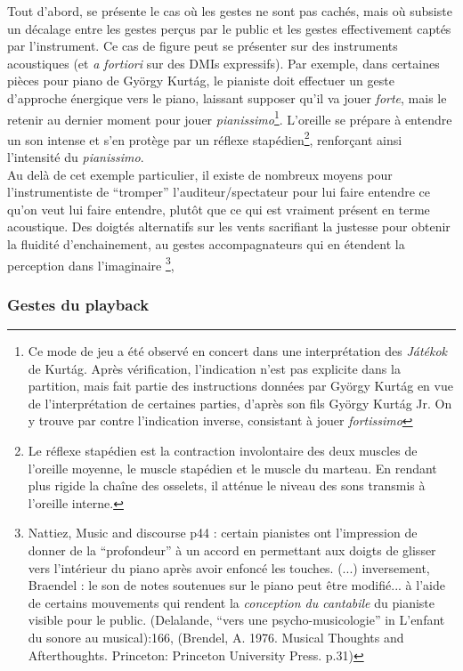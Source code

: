 \noindent Tout d'abord, se présente le cas où les gestes ne sont pas cachés, mais où subsiste un décalage entre les gestes perçus par le public et les gestes effectivement captés par l'instrument. Ce cas de figure peut se présenter sur des instruments acoustiques (et \textit{a fortiori} sur des \glspl{DMI} expressifs). Par exemple, dans certaines pièces pour piano de György Kurtág, le pianiste doit effectuer un geste d'approche énergique vers le piano, laissant supposer qu'il va jouer \textit{forte}, mais le retenir au dernier moment pour jouer \textit{pianissimo}\footnote{Ce mode de jeu a été observé en concert dans une interprétation des \textit{Játékok} de Kurtág. Après vérification, l'indication n'est pas explicite dans la partition, mais fait partie des instructions données par György Kurtág en vue de l'interprétation de certaines parties, d'après son fils György Kurtág Jr. On y trouve par contre l'indication inverse, consistant à jouer \textit{fortissimo} }. L'oreille se prépare à entendre un son intense et s'en protège par un réflexe stapédien\footnote{Le réflexe stapédien est la contraction involontaire des deux muscles de l'oreille moyenne, le muscle stapédien et le muscle du marteau. En rendant plus rigide la chaîne des osselets, il atténue le niveau des sons transmis à l'oreille interne.}, renforçant ainsi l'intensité du \textit{pianissimo}.\\
\indent Au delà de cet exemple particulier, il existe de nombreux moyens pour l'instrumentiste de ``tromper'' l'auditeur/spectateur pour lui faire entendre ce qu'on veut lui faire entendre, plutôt que ce qui est vraiment présent en terme acoustique. Des doigtés alternatifs sur les vents sacrifiant la justesse pour obtenir la fluidité d'enchainement, au gestes accompagnateurs qui en étendent la perception dans l'imaginaire \footnote{Nattiez, Music and discourse p44 : certain pianistes ont l'impression de donner de la ``profondeur'' à un accord en permettant aux doigts de glisser vers l'intérieur du piano après avoir enfoncé les touches. (...) inversement, Braendel : le son de notes soutenues sur le piano peut être modifié... à l'aide de certains mouvements qui rendent la \textit{conception du cantabile} du pianiste visible pour le public. (Delalande, ``vers une psycho-musicologie'' in L'enfant du sonore au musical):166, (Brendel, A. 1976. Musical Thoughts and Afterthoughts. Princeton: Princeton University Press. p.31)}, 

\subsubsection{Gestes du playback}

